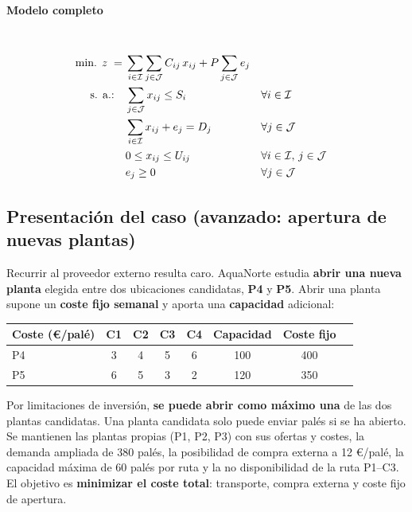\paragraph{Modelo completo}\mbox{}\\
\begin{align}
\mbox{min. } z \;=\;& \sum_{i \in \mathcal{I}} \sum_{j \in \mathcal{J}} C_{ij}\, x_{ij} + P \sum_{j \in \mathcal{J}} e_j \notag\\
\mbox{s. a.:}\quad
& \sum_{j \in \mathcal{J}} x_{ij} \leq S_i && \forall i \in \mathcal{I} \notag\\
& \sum_{i \in \mathcal{I}} x_{ij} + e_j = D_j && \forall j \in \mathcal{J} \notag\\
& 0 \leq x_{ij} \leq U_{ij} && \forall i \in \mathcal{I},\, j \in \mathcal{J} \notag\\
& e_j \geq 0 && \forall j \in \mathcal{J} \notag
\end{align}


\subsection{Presentación del caso (avanzado: apertura de nuevas plantas)}

Recurrir al proveedor externo resulta caro. AquaNorte estudia \textbf{abrir una nueva planta} elegida entre dos ubicaciones candidatas, \textbf{P4} y \textbf{P5}. Abrir una planta supone un \textbf{coste fijo semanal} y aporta una \textbf{capacidad} adicional:

\begin{center}
\begin{tabular}{lccccccc}
\toprule
\textbf{Coste (€/palé)} & \textbf{C1} & \textbf{C2} & \textbf{C3} & \textbf{C4} & \textbf{Capacidad} & \textbf{Coste fijo}\\
\midrule
P4 & 3 & 4 & 5 & 6 & 100 & 400\\
P5 & 6 & 5 & 3 & 2 & 120 & 350\\
\bottomrule
\end{tabular}
\end{center}

Por limitaciones de inversión, \textbf{se puede abrir como máximo una} de las dos plantas candidatas. Una planta candidata solo puede enviar palés si se ha abierto. Se mantienen las plantas propias (P1, P2, P3) con sus ofertas y costes, la demanda ampliada de 380 palés, la posibilidad de compra externa a 12 €/palé, la capacidad máxima de 60 palés por ruta y la no disponibilidad de la ruta P1--C3. El objetivo es \textbf{minimizar el coste total}: transporte, compra externa y coste fijo de apertura.

